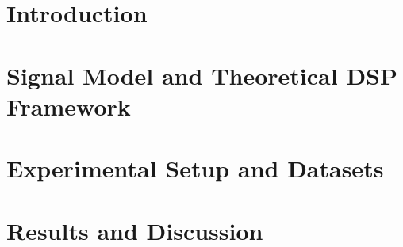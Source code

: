 \documentclass[journal]{IEEEtran}
\begin{document}

\section{Introduction}                                   %


\section{Signal Model and Theoretical DSP Framework}

\section{Experimental Setup and Datasets}                %


\section{Results and Discussion}
\end{document}
